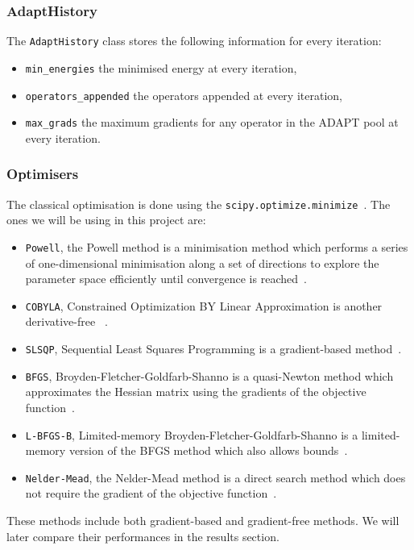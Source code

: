 \subsubsection{AdaptHistory}
\label{ssub:adapt-history}
The \texttt{AdaptHistory} class stores the following information for every iteration:
\begin{itemize}
	\item \texttt{min\_energies} the minimised energy at every iteration,
	\item \texttt{operators\_appended} the operators appended at every iteration,
	\item \texttt{max\_grads} the maximum gradients for any operator in the ADAPT pool at every iteration.
\end{itemize}

\subsubsection{Optimisers}
\label{ssub:optimisers}
The classical optimisation is done using the \texttt{scipy.optimize.minimize}~\cite{scipy}. The ones we will be using in this project are:
\begin{itemize}
	\item \texttt{Powell}, the Powell method is a minimisation method which performs a series of one-dimensional minimisation along a set of directions to explore the parameter space efficiently until convergence is reached~\cite{powell1964}.
	\item \texttt{COBYLA}, Constrained Optimization BY Linear Approximation is another derivative-free ~\cite{powell1994}.
	\item \texttt{SLSQP}, Sequential Least Squares Programming is a gradient-based method~\cite{kraft1988}.
	\item \texttt{BFGS}, Broyden-Fletcher-Goldfarb-Shanno is a quasi-Newton method which approximates the Hessian matrix using the gradients of the objective function~\cite{bfgs}.
	\item \texttt{L-BFGS-B}, Limited-memory Broyden-Fletcher-Goldfarb-Shanno is a limited-memory version of the BFGS method which also allows bounds~\cite{byrd1995}.
	\item \texttt{Nelder-Mead}, the Nelder-Mead method is a direct search method which does not require the gradient of the objective function~\cite{Nelder1965}.
\end{itemize}

These methods include both gradient-based and gradient-free methods. We will later compare their performances in the results section.


